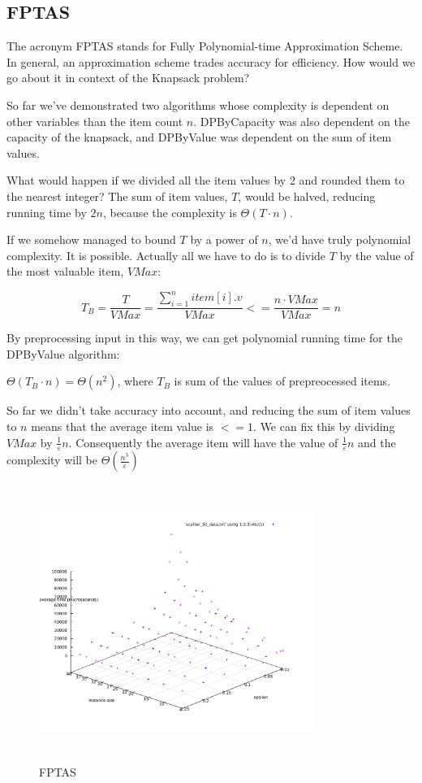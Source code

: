 \documentclass[a4paper,10pt,twocolumn]{article}
\begin{document}
\subsection{FPTAS}
The acronym FPTAS stands for Fully Polynomial-time Approximation Scheme. In general, an approximation scheme trades
accuracy for efficiency. How would we go about it in context of the Knapsack problem?

So far we've demonstrated two algorithms whose complexity is dependent on other variables than the item count $n$.
DPByCapacity was also dependent on the capacity of the knapsack, and DPByValue was dependent on the sum of item values.

What would happen if we divided all the item values by 2 and rounded them to the nearest integer? The sum of item
values, $T$, would be halved, reducing running time by $2n$, because the complexity is $\Theta(T \cdot n)$.

If we somehow managed to bound $T$ by a power of $n$, we'd have truly polynomial complexity. It is possible. Actually
all we have to do is to divide $T$ by the value of the most valuable item, $VMax$:

$$T_{B} = \frac{T}{VMax} = \frac{\sum_{i=1}^{n} item[i].v}{VMax} <= \frac{n \cdot VMax}{VMax} = n$$

By preprocessing input in this way, we can get polynomial running time for the DPByValue algorithm:

$\Theta(T_{B} \cdot n) = \Theta(n^2)$, where $T_B$ is sum of the values of prepreocessed items.

So far we didn't take accuracy into account, and reducing the sum of item values to $n$ means that the average item
value is $<= 1$. We can fix this by dividing $VMax$ by $\frac{1}{\varepsilon} n$. Consequently the average item will have the
value of $\frac{1}{\varepsilon} n$ and the complexity will be $\Theta(\frac{n^3}{\varepsilon})$

\begin{figure}[H]
  \begin{center}
    \hspace*{-0.5cm}\includegraphics[width=9cm,height=9cm]{gnuplot/pdf/FPTAS_splot.pdf}
  \end{center}
  \caption{FPTAS}\label{fptasPlot}
\end{figure}
\end{document}
